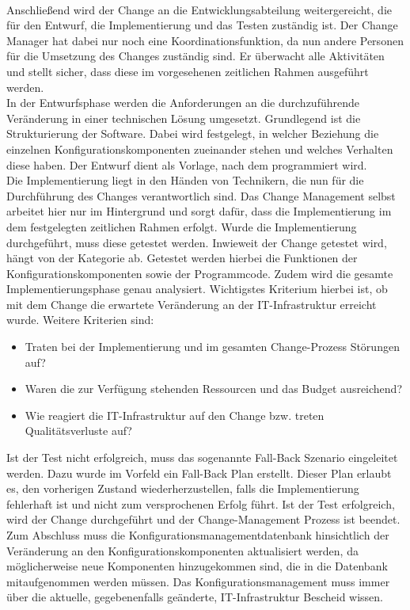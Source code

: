 \\
Anschließend wird der Change an die Entwicklungsabteilung weitergereicht, die für den Entwurf, die Implementierung und das Testen zuständig ist. Der Change Manager hat dabei nur noch eine Koordinationsfunktion, da nun andere Personen für die Umsetzung des Changes zuständig sind. Er überwacht alle Aktivitäten und stellt sicher, dass diese im vorgesehenen zeitlichen Rahmen ausgeführt werden. 
\\
In der Entwurfsphase werden die Anforderungen an die durchzuführende Veränderung in einer technischen Lösung umgesetzt. Grundlegend ist die Strukturierung der Software. Dabei wird festgelegt, in welcher Beziehung die einzelnen Konfigurationskomponenten zueinander stehen und welches Verhalten diese haben. Der Entwurf dient als Vorlage, nach dem programmiert wird. 
\\
Die Implementierung liegt in den Händen von Technikern, die nun für die Durchführung des Changes verantwortlich sind. Das Change Management selbst arbeitet hier nur im Hintergrund und sorgt dafür, dass die Implementierung im dem festgelegten zeitlichen Rahmen erfolgt. Wurde die Implementierung durchgeführt, muss diese getestet werden. Inwieweit der Change getestet wird, hängt von der Kategorie ab. Getestet werden hierbei die Funktionen der Konfigurationskomponenten sowie der Programmcode. Zudem wird die gesamte Implementierungsphase genau analysiert. Wichtigstes Kriterium hierbei ist, ob mit dem Change die erwartete Veränderung an der IT-Infrastruktur erreicht wurde. Weitere Kriterien sind:
\begin{itemize}
	\item 	Traten bei der Implementierung und im gesamten Change-Prozess Störungen auf?
	\item 	Waren die zur Verfügung stehenden Ressourcen und das Budget ausreichend?
	\item Wie reagiert die IT-Infrastruktur auf den Change bzw. treten Qualitätsverluste auf?
\end{itemize}
Ist der Test nicht erfolgreich, muss das sogenannte Fall-Back Szenario eingeleitet werden. Dazu wurde im Vorfeld ein Fall-Back Plan erstellt. Dieser Plan erlaubt es, den vorherigen Zustand wiederherzustellen, falls die Implementierung fehlerhaft ist und nicht zum versprochenen Erfolg führt. Ist der Test erfolgreich, wird der Change durchgeführt und der Change-Management Prozess ist beendet. 
\\
Zum Abschluss muss die Konfigurationsmanagementdatenbank hinsichtlich der Veränderung an den Konfigurationskomponenten aktualisiert werden, da möglicherweise neue Komponenten hinzugekommen sind, die in die Datenbank mitaufgenommen werden müssen. Das Konfigurationsmanagement muss immer über die aktuelle, gegebenenfalls geänderte, IT-Infrastruktur Bescheid wissen.
